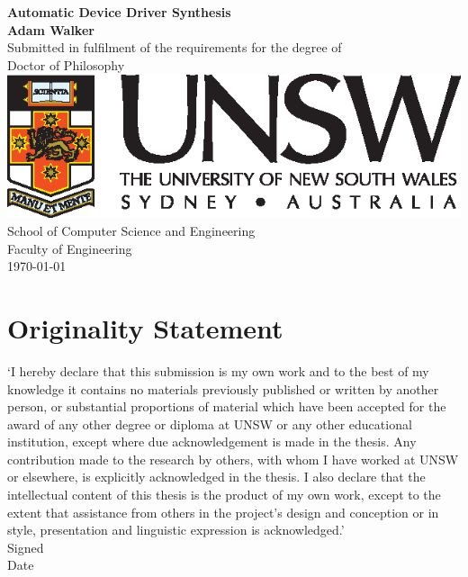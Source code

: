 \documentclass[a4paper,twoside,openright,11pt,oldfontcommands]{memoir}
\theoremstyle{definition}
\begin{document}
\nobibliography*

\frontmatter

\thispagestyle{empty}
\mbox{}
\vfill
\begin{center}
{\Huge\sffamily\textbf{Automatic Device Driver Synthesis}}\\[2cm]
{\Large\sffamily\bfseries Adam Walker}\\[2cm]
Submitted in fulfilment of the requirements for the degree of \\
Doctor of Philosophy\\[1cm]
\includegraphics{imgs/unsw} \\[1cm]
School of Computer Science and Engineering \\[0.5cm]
Faculty of Engineering \\[2cm]
\monthyear\today
\end{center}
\par
\vfill
\clearpage

\thispagestyle{plain}
\section*{Originality Statement}

`I hereby declare that this submission is my own work and to the best of my
knowledge it contains no materials previously published or written by another
person, or substantial proportions of material which have been accepted for
the award of any other degree or diploma at UNSW or any other educational
institution, except where due acknowledgement is made in the thesis. Any
contribution made to the research by others, with whom I have worked at UNSW
or elsewhere, is explicitly acknowledged in the thesis.  I also declare that
the intellectual content of this thesis is the product of my own work, except
to the extent that assistance from others in the project's design and
conception or in style, presentation and linguistic expression is
acknowledged.'\\[0.5cm]
Signed\hspace{0.5cm}\dotfill\hfill\\[0.5cm]
Date\hspace{0.5cm}\dotfill\hfill\\
\vfil\newpage
\end{document}
